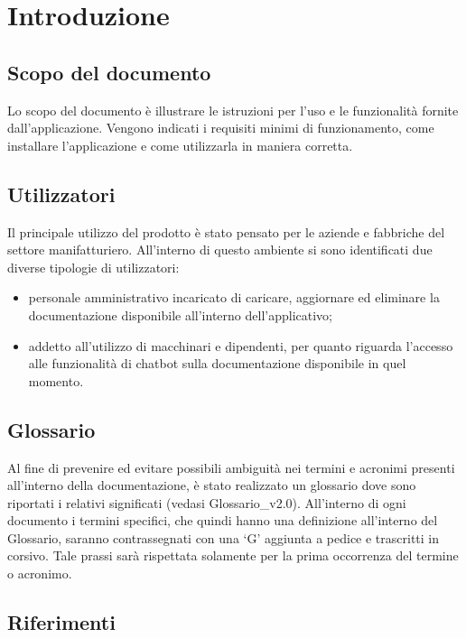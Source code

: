 \chapter{Introduzione} \label{cap:intro}

\section{Scopo del documento}
Lo scopo del documento è illustrare le istruzioni per l'uso e le funzionalità fornite dall'applicazione. Vengono indicati i requisiti minimi di funzionamento, come installare l'applicazione e come utilizzarla in maniera corretta.

\section{Utilizzatori}
Il principale utilizzo del prodotto è stato pensato per le aziende e fabbriche del settore manifatturiero. All'interno di questo ambiente si sono identificati due diverse tipologie di utilizzatori:
\begin{itemize}
    \item personale amministrativo incaricato di caricare, aggiornare ed eliminare la documentazione disponibile all'interno dell'applicativo;
    \item addetto all'utilizzo di macchinari e dipendenti, per quanto riguarda l'accesso alle funzionalità di chatbot sulla documentazione disponibile in quel momento.
\end{itemize}

\section{Glossario}
Al fine di prevenire ed evitare possibili ambiguità nei termini e acronimi presenti all’interno della documentazione, è stato realizzato un glossario dove sono riportati i relativi significati (vedasi Glossario\_v2.0). All’interno di ogni documento i termini specifici, che quindi hanno una definizione all’interno del Glossario, saranno contrassegnati con una ‘G’ aggiunta a pedice e trascritti in corsivo. Tale prassi sarà rispettata solamente per la prima occorrenza del termine o acronimo.

\section{Riferimenti}
